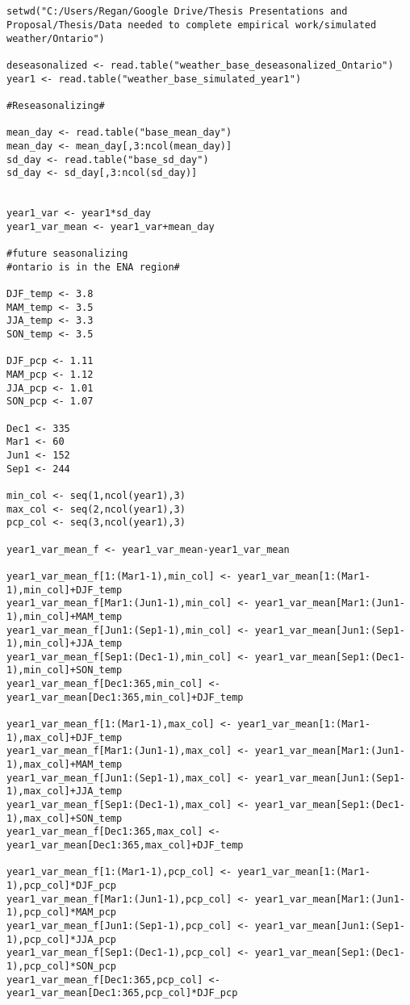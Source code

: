\begin{lstlisting}


setwd("C:/Users/Regan/Google Drive/Thesis Presentations and Proposal/Thesis/Data needed to complete empirical work/simulated weather/Ontario")

deseasonalized <- read.table("weather_base_deseasonalized_Ontario")
year1 <- read.table("weather_base_simulated_year1")

#Reseasonalizing#

mean_day <- read.table("base_mean_day")
mean_day <- mean_day[,3:ncol(mean_day)]
sd_day <- read.table("base_sd_day")
sd_day <- sd_day[,3:ncol(sd_day)]


year1_var <- year1*sd_day
year1_var_mean <- year1_var+mean_day

#future seasonalizing 
#ontario is in the ENA region#

DJF_temp <- 3.8
MAM_temp <- 3.5
JJA_temp <- 3.3
SON_temp <- 3.5

DJF_pcp <- 1.11
MAM_pcp <- 1.12
JJA_pcp <- 1.01
SON_pcp <- 1.07

Dec1 <- 335
Mar1 <- 60
Jun1 <- 152
Sep1 <- 244

min_col <- seq(1,ncol(year1),3)
max_col <- seq(2,ncol(year1),3)
pcp_col <- seq(3,ncol(year1),3)

year1_var_mean_f <- year1_var_mean-year1_var_mean

year1_var_mean_f[1:(Mar1-1),min_col] <- year1_var_mean[1:(Mar1-1),min_col]+DJF_temp
year1_var_mean_f[Mar1:(Jun1-1),min_col] <- year1_var_mean[Mar1:(Jun1-1),min_col]+MAM_temp
year1_var_mean_f[Jun1:(Sep1-1),min_col] <- year1_var_mean[Jun1:(Sep1-1),min_col]+JJA_temp
year1_var_mean_f[Sep1:(Dec1-1),min_col] <- year1_var_mean[Sep1:(Dec1-1),min_col]+SON_temp
year1_var_mean_f[Dec1:365,min_col] <- year1_var_mean[Dec1:365,min_col]+DJF_temp

year1_var_mean_f[1:(Mar1-1),max_col] <- year1_var_mean[1:(Mar1-1),max_col]+DJF_temp
year1_var_mean_f[Mar1:(Jun1-1),max_col] <- year1_var_mean[Mar1:(Jun1-1),max_col]+MAM_temp
year1_var_mean_f[Jun1:(Sep1-1),max_col] <- year1_var_mean[Jun1:(Sep1-1),max_col]+JJA_temp
year1_var_mean_f[Sep1:(Dec1-1),max_col] <- year1_var_mean[Sep1:(Dec1-1),max_col]+SON_temp
year1_var_mean_f[Dec1:365,max_col] <- year1_var_mean[Dec1:365,max_col]+DJF_temp

year1_var_mean_f[1:(Mar1-1),pcp_col] <- year1_var_mean[1:(Mar1-1),pcp_col]*DJF_pcp
year1_var_mean_f[Mar1:(Jun1-1),pcp_col] <- year1_var_mean[Mar1:(Jun1-1),pcp_col]*MAM_pcp
year1_var_mean_f[Jun1:(Sep1-1),pcp_col] <- year1_var_mean[Jun1:(Sep1-1),pcp_col]*JJA_pcp
year1_var_mean_f[Sep1:(Dec1-1),pcp_col] <- year1_var_mean[Sep1:(Dec1-1),pcp_col]*SON_pcp
year1_var_mean_f[Dec1:365,pcp_col] <- year1_var_mean[Dec1:365,pcp_col]*DJF_pcp



\end{lstlisting}
